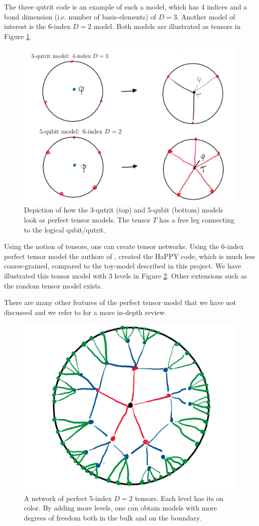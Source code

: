 \documentclass[letter,12pt]{article}
\begin{document}
The three qutrit code is an example of such a model, which has 4 indices and a bond dimension (i.e. number of basis-elements) of $D=3$.
Another model of interest is the 6-index $D=2$ model. Both models are illustrated as tensors in Figure \ref{fig:adscftfig8}.
\begin{figure}[htb]
	\centering
	\includegraphics[width=0.95\linewidth]{ADS_CFT_Fig8}
	\caption{Depiction of how the 3-qutrit (top) and 5-qubit (bottom) models look as perfect tensor models. The tensor $T$ has a free leg connecting to the logical qubit/qutrit.}
	\label{fig:adscftfig8}
\end{figure}

 Using the notion of tensors, one can create tensor networks. Using the 6-index perfect tensor model the authors of \cite{bib3}, created the HaPPY code, which is much less coarse-grained, compared to the toy-model described in this project. We have illustrated this tensor model with 3 levels in Figure \ref{fig:adscftfig10}. Other extensions such as the random tensor model exists. 
 
 There are many other features of the perfect tensor model that we have not discussed and we refer to \cite{bib1} for a more in-depth review.
 \begin{figure}[H]
 	\centering
 	\includegraphics[width=0.35\linewidth]{ADS_CFT_Fig10}
 	\caption{A network of perfect 5-index $D=2$ tensors. Each level has its on color. By adding more levels, one can obtain models with more degrees of freedom both in the bulk and on the boundary.}
 	\label{fig:adscftfig10}
 \end{figure}
\end{document}
